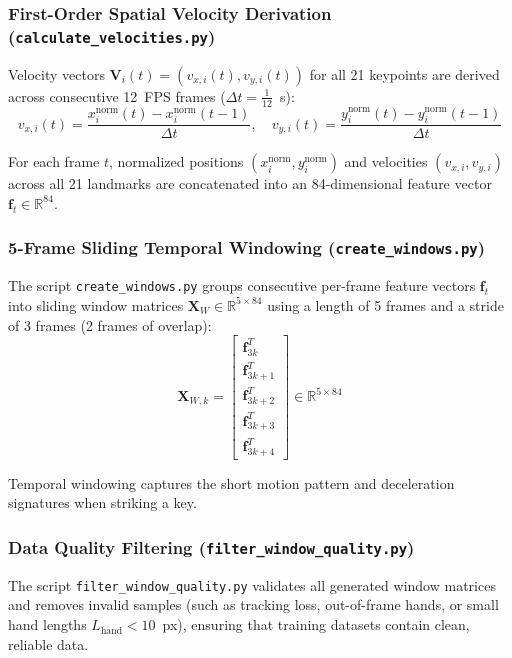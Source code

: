 \subsubsection{First-Order Spatial Velocity Derivation (\texttt{calculate\_velocities.py})}
Velocity vectors $\mathbf{V}_i(t) = (v_{x,i}(t), v_{y,i}(t))$ for all 21 keypoints are derived across consecutive 12~FPS frames ($\Delta t = \frac{1}{12}$~s):
\begin{equation}
v_{x,i}(t) = \frac{x_i^{\text{norm}}(t) - x_i^{\text{norm}}(t-1)}{\Delta t}, \quad
v_{y,i}(t) = \frac{y_i^{\text{norm}}(t) - y_i^{\text{norm}}(t-1)}{\Delta t}
\label{eq:velocity_derivation_pipeline}
\end{equation}

For each frame $t$, normalized positions $(x_i^{\text{norm}}, y_i^{\text{norm}})$ and velocities $(v_{x,i}, v_{y,i})$ across all 21 landmarks are concatenated into an 84-dimensional feature vector $\mathbf{f}_t \in \mathbb{R}^{84}$.

\subsubsection{5-Frame Sliding Temporal Windowing (\texttt{create\_windows.py})}
The script \texttt{create\_windows.py} groups consecutive per-frame feature vectors $\mathbf{f}_t$ into sliding window matrices $\mathbf{X}_W \in \mathbb{R}^{5 \times 84}$ using a length of 5 frames and a stride of 3 frames (2 frames of overlap):
\begin{equation}
\mathbf{X}_{W, k} = \begin{bmatrix}
\mathbf{f}_{3k}^T \\
\mathbf{f}_{3k+1}^T \\
\mathbf{f}_{3k+2}^T \\
\mathbf{f}_{3k+3}^T \\
\mathbf{f}_{3k+4}^T
\end{bmatrix} \in \mathbb{R}^{5 \times 84}
\label{eq:sliding_window_matrix}
\end{equation}

Temporal windowing captures the short motion pattern and deceleration signatures when striking a key.

\subsubsection{Data Quality Filtering (\texttt{filter\_window\_quality.py})}
The script \texttt{filter\_window\_quality.py} validates all generated window matrices and removes invalid samples (such as tracking loss, out-of-frame hands, or small hand lengths $L_{\text{hand}} < 10$~px), ensuring that training datasets contain clean, reliable data.

